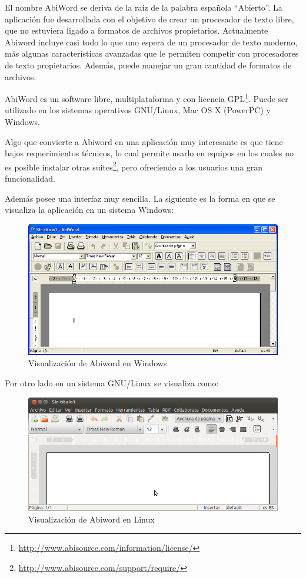 \documentclass[12pt]{article}
\begin{document}
El nombre AbiWord se deriva de la raíz de la palabra española ``Abierto''. La aplicación fue desarrollada con el objetivo de crear un procesador de texto libre, que no estuviera ligado a formatos de archivos propietarios. Actualmente Abiword incluye casi todo lo que uno espera de un procesador de texto moderno, más algunas características avanzadas que le permiten competir con procesadores de texto propietarios. Además, puede manejar un gran cantidad de formatos de archivos.

AbiWord es un software libre, multiplataforma y con licencia GPL\footnote{\url{http://www.abisource.com/information/license/}}. Puede ser utilizado en los sistemas operativos GNU/Linux, Mac OS X (PowerPC) y Windows.

Algo que convierte a Abiword en una aplicación muy interesante es que tiene bajos requerimientos técnicos, lo cual permite usarlo en equipos en los cuales no es posible instalar otras suites\footnote{\url{http://www.abisource.com/support/require/}}, pero ofreciendo a los usuarios una gran funcionalidad.

Además posee una interfaz muy sencilla. La siguiente es la forma en que se visualiza la aplicación en un sistema Windows:

\begin{figure}[H]
\centering
\includegraphics[width=1\textwidth]{abiword_windows.png}
\renewcommand{\figurename}{Fig.}
\caption{Visualización de Abiword en Windows}
\label{contexto:figura}
\end{figure}

Por otro lado en un sistema GNU/Linux se visualiza como:

\begin{figure}[H]
\centering
\includegraphics[width=1\textwidth]{abiword_linux.png}
\renewcommand{\figurename}{Fig.}
\caption{Visualización de Abiword en Linux}
\label{contexto:figura}
\end{figure}
\end{document}
